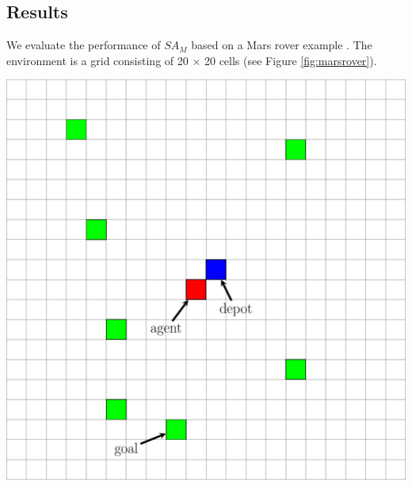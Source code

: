 \documentclass[a0,landscape]{a0poster}
\newcommand{\SAM}{\emph{$SA_M$}\xspace}
\begin{document}
\begin{multicols}{4}

\section*{Results}
We evaluate the performance of \SAM based on a Mars rover example \cite{DuffHT06}. The environment is a grid consisting of 20 $\times$ 20 cells (see Figure \ref{fig:marsrover}).

\begin{center}\vspace{1cm}
\includegraphics[scale=1]{./figs/mg_example.pdf}
\label{fig:marsrover}
\end{center}\vspace{1cm}
%
% 
% 
%


\end{multicols}
\end{document}
